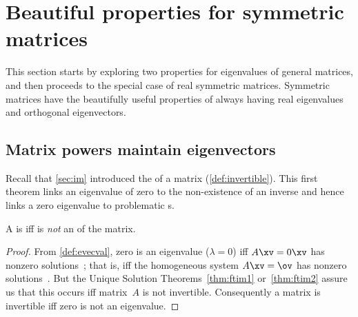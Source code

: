 

\section{Beautiful properties for symmetric matrices}
\label{sec:sm}
\secttoc

\begin{comment}
\pooliv{\S5.4} \layiv{\S7.1} \holti{\S8.3} \cite[\S10]{Davis99a}
\end{comment}



This section starts by exploring two properties for eigenvalues of general matrices, and then proceeds to the special case of real symmetric  matrices.
Symmetric matrices have the beautifully useful properties of always having real eigenvalues and orthogonal eigenvectors.



\subsection{Matrix powers maintain eigenvectors}
\label{sec:mpmev}

Recall that \autoref{sec:im} introduced the  of a matrix (\autoref{def:invertible}).
This first theorem links an eigenvalue of zero to the non-existence of an inverse and hence links a zero eigenvalue to problematic s.


\begin{theorem} \label{thm:evalinv} 
A  is  iff  is \emph{not} an  of the matrix.
\end{theorem}
\begin{proof} 
From \autoref{def:evecval}, zero is an eigenvalue (\(\lambda=0\)) iff \(A\xv=0\xv\) has nonzero solutions~\xv; that is, iff the homogeneous system \(A\xv=\ov\) has nonzero solutions~\xv.
But the Unique Solution Theorems~\ref{thm:ftim1} or~\ref{thm:ftim2} assure us that this occurs iff matrix~\(A\) is not invertible.
Consequently a matrix is invertible iff zero is not an eigenvalue.
\end{proof}

